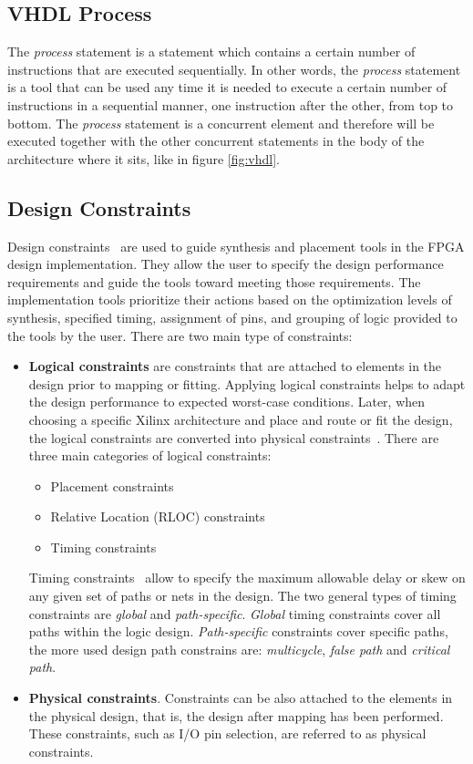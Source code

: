 \subsection{VHDL Process}
\noindent The \textit{process} statement is a statement which contains a certain number of instructions that are executed sequentially. In other words, the \textit{process} statement is a tool that can be used any time it is needed to execute a certain number of instructions in a sequential manner, one instruction after the other, from top to bottom.
\newline
The \textit{process} statement is a concurrent element and therefore will be executed together with the other concurrent statements in the body of the architecture where it sits, like in figure \ref{fig:vhdl}.

\subsection{Design Constraints}
\noindent Design constraints~\cite{constraints1} are used to guide synthesis and placement tools in the FPGA design implementation.
They allow the user to specify the design
performance requirements and guide the tools toward meeting those requirements. The
implementation tools prioritize their actions based on the optimization levels of synthesis,
specified timing, assignment of pins, and grouping of logic provided to the tools by the user.
There are two main type of constraints: 
\begin{itemize}
	\item \textbf{Logical constraints} are constraints that are attached to elements in the design prior to
	mapping or fitting. Applying logical constraints helps to adapt the design performance to expected worst-case conditions. Later, when choosing a specific Xilinx architecture and place and route or fit the design, the logical constraints are converted into physical constraints~\cite{constraints2}.
	\newline
	There are three main categories of logical constraints:
	\begin{itemize}
		\item Placement constraints
		\item Relative Location (RLOC) constraints
		\item Timing constraints
	\end{itemize}
	Timing constraints~\cite{timing98} allow to specify the maximum allowable delay or skew on any given set of paths or nets in the design.
	The two general types of timing constraints are \textit{global} and \textit{path-specific}.
	\textit{Global} timing constraints cover all paths within the logic design.
	\textit{Path-specific} constraints cover specific paths, the more used design path constrains are: \textit{multicycle}, \textit{false path} and \textit{critical path}. 
	\item \textbf{Physical constraints}. Constraints can be also attached to the elements in the physical design, that is, the design
	after mapping has been performed. These constraints, such as I/O pin selection, are referred to as physical constraints.	 
\end{itemize}
